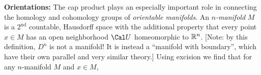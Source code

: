\def\ccy{\Cyan}		  %
\def\cpb{\ProcessBlue}	  %
\def\csb{\SkyBlue}	  %
\def\ctu{\Turquoise}	  %
\def\ctb{\TealBlue}	  %
\def\caq{\Aquamarine}	  %
\def\cbg{\BlueGreen}	  %
\def\cem{\Emerald}	  %
\def\csg{\SeaGreen}	  %
\def\cgg{\Green}	  %
\def\cfg{\ForestGreen}	  %
\def\cpg{\PineGreen}	  %
\def\clg{\LimeGreen}	  %
\def\cyg{\YellowGreen}	  %
\def\cspg{\SpringGreen}	  %
\def\cog{\OliveGreen}	  %
\def\pars{\RawSienna}	  %
\def\cse{\Sepia}		  %
\def\cbr{\Brown}		  %
\def\cta{\Tan}		  %
\def\cgr{\Gray}		  %
\def\cbl{\Black}		  %
\def\cwh{\White}		  %


\loadmsbm



\def\ctln{\centerline}
\def\u{\underbar}
\def\ssk{\smallskip}
\def\msk{\medskip}
\def\bsk{\bigskip}
\def\hsk{\hskip.1in}
\def\hhsk{\hskip.2in}
\def\dsl{\displaystyle}
\def\hskp{\hskip1.5in}

\def\lra{$\Leftrightarrow$ }
\def\ra{\rightarrow}
\def\mpto{\logmapsto}
\def\pu{\pi_1}
\def\mpu{$\pi_1$}
\def\sig{\Sigma}
\def\msig{$\Sigma$}
\def\ep{\epsilon}
\def\sset{\subseteq}
\def\del{\partial}
\def\inv{^{-1}}
\def\wtl{\widetilde}
\def\del{\partial}
\def\delp{\partial^\prime}
\def\delpp{\partial^{\prime\prime}}
\def\sgn{{\roman{sgn}}}
\def\wtih{\widetilde{H}}
\def\bbz{{\Bbb Z}}
\def\bbr{{\Bbb R}}
\def\bbq{{\Bbb Q}}
\def\bbc{{\Bbb C}}
\def\hdsk{\hskip.7in}
\def\hdskb{\hskip.9in}
\def\hdskc{\hskip1.1in}
\def\hdskd{\hskip1.3in}
\def\Hom{\text{Hom}}
\def\Ext{\text{Ext}}
\def\larr{\leftarrow}


{\bf Orientations:} The cap product plays an especially important role in connecting the homology and cohomology groups of 
{\it orientable manifolds}.
An {\it $n$-manifold} $M$ is a $2^{\text{nd}}$ countable, Hausdorff space with the additional property that every point $x\in M$ has an
open neighborhood $\Cal U$ homeomorphic to $\bbr^n$. [Note: by this definition, $D^n$ is not a manifold! It is instead a
``manifold with boundary'', which have their own parallel and very similar theory.] 
Using excision
we find that for any $n$-manifold $M$ and $x\in M$, 

